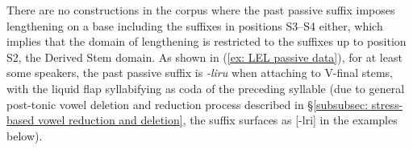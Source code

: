     \newpage
    \z
\z

There are no constructions in the corpus where the past passive suffix imposes lengthening on a base including the suffixes in positions S3--S4 either, which implies that the domain of lengthening is restricted to the suffixes up to position S2, the Derived Stem domain. As shown in (\ref{ex: LEL passive data}), for at least some speakers, the past passive suffix is \textit{-liru} when attaching to V-final stems, with the liquid flap syllabifying as coda of the preceding syllable (due to general post-tonic vowel deletion and reduction process described in §\ref{subsubsec: stress-based vowel reduction and deletion}, the suffix surfaces as [-lri] in the examples below).

\largerpage
\ea\label{ex: LEL passive data}

